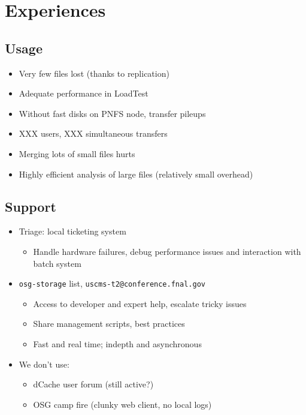 \documentclass{beamer}
\begin{document}
\section{Experiences}
\subsection{Usage}
\begin{frame}
\begin{itemize}
	\item Very few files lost (thanks to replication)
	\item Adequate performance in LoadTest
	\item Without fast disks on PNFS node, transfer pileups
	\item XXX users, XXX simultaneous transfers
	\item Merging lots of small files hurts
	\item Highly efficient analysis of large files (relatively small overhead)
\end{itemize}
\end{frame}

\subsection{Support}
\begin{frame}
\begin{itemize}
	\item Triage: local ticketing system
	\begin{itemize}
		\item Handle hardware failures, debug performance issues and interaction with batch system
	\end{itemize}
	\item {\tt osg-storage} list, {\tt uscms-t2@conference.fnal.gov}
	\begin{itemize}
		\item Access to developer and expert help, escalate tricky issues
		\item Share management scripts, best practices
		\item Fast and real time; indepth and asynchronous
	\end{itemize}
	\item We don't use:
	\begin{itemize}
		\item dCache user forum (still active?)
		\item OSG camp fire (clunky web client, no local logs)
	\end{itemize}
\end{itemize}
\end{frame}
\end{document}
